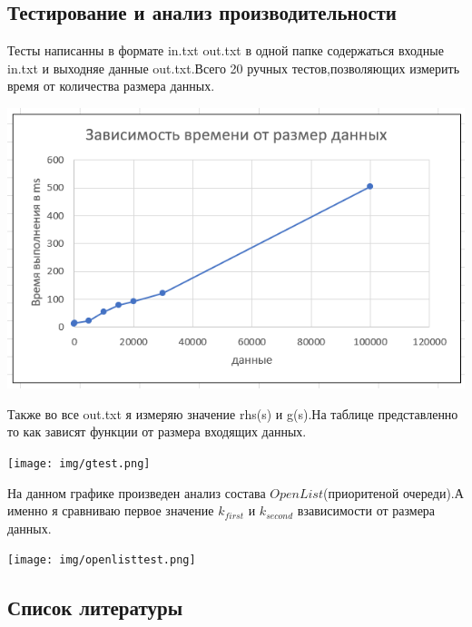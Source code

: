 \documentclass[12pt]{article}
\begin{document}
    
\newpage  
\begin{center}
   \section*{Тестирование и анализ производительности}
\end{center}
Тесты написанны в формате in.txt out.txt в одной папке содержаться входные in.txt и выходняе данные out.txt.Всего 20 ручных тестов,позволяющих измерить время от количества размера данных.
\begin{center}
        \includegraphics[width=1.1\textwidth]{img/datetime.png}
    \end{center}
Также во все out.txt  я измеряю значение rhs(s) и g(s).На таблице представленно то как зависят функции от размера входящих данных.
\begin{center}
        \texttt{[image: img/gtest.png]}
    \end{center}
На данном графике произведен анализ состава $OpenList$(приоритеной очереди).А именно я сравниваю первое значение $k_{first}$ и $k_{second}$  взависимости от размера данных.
\begin{center}
        \texttt{[image: img/openlisttest.png]}
    \end{center}
\newpage  
\begin{center}
   \section*{Список литературы}
\end{center}

\nocite{*}
\printbibliography
\end{document}

